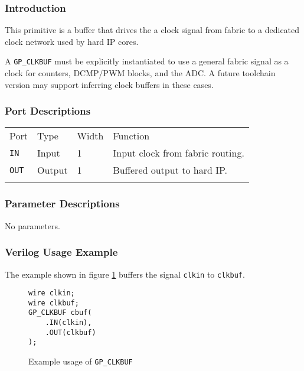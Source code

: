 \documentclass[11pt]{article}
\newcommand{\tokenstyle}[1]{\texttt{#1}}
\newcommand{\whenstyle}[1]{{\fontseries{sb}\selectfont#1}}
\newcommand{\thinhline}{\Xhline{1\arrayrulewidth}}
\newcommand{\thickhline}{\Xhline{2.5\arrayrulewidth}}
\begin{document}
\subsubsection{Introduction}
This primitive is a buffer that drives the a clock signal from fabric to a dedicated clock network used by hard IP cores.

A \tokenstyle{GP\_CLKBUF} must be explicitly instantiated to use a general fabric signal as a clock for counters, DCMP/PWM
blocks, and the ADC. A future toolchain version may support inferring clock buffers in these cases.

\subsubsection{Port Descriptions}

\begin{tabularx}{\textwidth}{lllX}
\thinhline
\whenstyle{Port} & \whenstyle{Type} & \whenstyle{Width} & \whenstyle{Function} \\
\thickhline
\tokenstyle{IN} & Input & 1 & Input clock from fabric routing. \\
\thinhline
\tokenstyle{OUT} & Output & 1 & Buffered output to hard IP. \\
\thinhline
\end{tabularx}

\subsubsection{Parameter Descriptions}

No parameters.

\subsubsection{Verilog Usage Example}

The example shown in figure \ref{gp-clkbuf-example} buffers the signal \tokenstyle{clkin} to \tokenstyle{clkbuf}.

\begin{figure}[h]
\begin{lstlisting}
wire clkin;
wire clkbuf;
GP_CLKBUF cbuf(
	.IN(clkin),
	.OUT(clkbuf)
);
\end{lstlisting}
\caption{Example usage of \tokenstyle{GP\_CLKBUF}}
\label{gp-clkbuf-example}
\end{figure}

\end{document}
